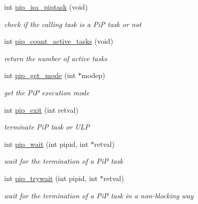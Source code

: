 \begin{DoxyCompactItemize}
\item 
int \hyperlink{group__libpip_ga4b6905e1eb5ffa6427d72d7e73408639}{pip\-\_\-isa\-\_\-piptask} (void)
\begin{DoxyCompactList}\small\item\em check if the calling task is a Pi\-P task or not \end{DoxyCompactList}\end{DoxyCompactItemize}
\begin{DoxyCompactItemize}
\item 
int \hyperlink{group__libpip_gac45cbabfd20fa2f8f4e9004474922137}{pip\-\_\-count\-\_\-active\-\_\-tasks} (void)
\begin{DoxyCompactList}\small\item\em return the number of active tasks \end{DoxyCompactList}\end{DoxyCompactItemize}
\begin{DoxyCompactItemize}
\item 
int \hyperlink{group__libpip_gab603f68c1ce972a5f3bfb8c95fcfb555}{pip\-\_\-get\-\_\-mode} (int $\ast$modep)
\begin{DoxyCompactList}\small\item\em get the Pi\-P execution mode \end{DoxyCompactList}\end{DoxyCompactItemize}
\begin{DoxyCompactItemize}
\item 
int \hyperlink{group__libpip_gaf9be37d927121b9327b5fca2417ccec2}{pip\-\_\-exit} (int retval)
\begin{DoxyCompactList}\small\item\em terminate Pi\-P task or U\-L\-P \end{DoxyCompactList}\end{DoxyCompactItemize}
\begin{DoxyCompactItemize}
\item 
int \hyperlink{group__libpip_ga3adad6a3e2311a46b2bfdd9d9062811b}{pip\-\_\-wait} (int pipid, int $\ast$retval)
\begin{DoxyCompactList}\small\item\em wait for the termination of a Pi\-P task \end{DoxyCompactList}\end{DoxyCompactItemize}
\begin{DoxyCompactItemize}
\item 
int \hyperlink{group__libpip_ga02cab8b77b62ffcd98bd1bbb1e32b7e7}{pip\-\_\-trywait} (int pipid, int $\ast$retval)
\begin{DoxyCompactList}\small\item\em wait for the termination of a Pi\-P task in a non-\/blocking way \end{DoxyCompactList}\end{DoxyCompactItemize}
